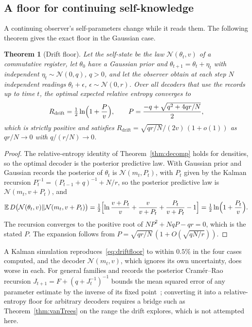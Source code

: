 \documentclass[12pt]{article}
\newtheorem{theorem}{Theorem}[section]
\theoremstyle{definition}
\theoremstyle{remark}
\newcommand{\E}{\mathbb E}
\begin{document}
\subsection{A floor for continuing self-knowledge}

A continuing observer's self-parameters change while it reads them. The following theorem gives the exact floor in the Gaussian case.

\begin{theorem}[Drift floor]\label{thm:drift}
Let the self-state be the law $\mathcal N(\theta_t,v)$ of a commutative register, let $\theta_0$ have a Gaussian prior and $\theta_{t+1}=\theta_t+\eta_t$ with independent $\eta_t\sim\mathcal N(0,q)$, $q>0$, and let the observer obtain at each step $N$ independent readings $\theta_t+\epsilon$, $\epsilon\sim\mathcal N(0,r)$. Over all decoders that use the records up to time $t$, the optimal expected relative entropy converges to
\begin{equation}\label{eq:driftfloor}
R_{\mathrm{drift}}=\tfrac12\ln\Bigl(1+\frac Pv\Bigr),\qquad P=\frac{-q+\sqrt{q^2+4qr/N}}{2},
\end{equation}
which is strictly positive and satisfies $R_{\mathrm{drift}}=\sqrt{qr/N}/(2v)\,(1+o(1))$ as $qr/N\to0$ with $q/(r/N)\to0$.
\end{theorem}

\begin{proof}
The relative-entropy identity of Theorem~\ref{thm:decomp} holds for densities, so the optimal decoder is the posterior predictive law. With Gaussian prior and Gaussian records the posterior of $\theta_t$ is $\mathcal N(m_t,P_t)$, with $P_t$ given by the Kalman recursion $P_{t}^{-1}=(P_{t-1}+q)^{-1}+N/r$, so the posterior predictive law is $\mathcal N(m_t,v+P_t)$, and
\[
\E\,D\bigl(\mathcal N(\theta_t,v)\Vert\mathcal N(m_t,v+P_t)\bigr)=\tfrac12\Bigl[\ln\frac{v+P_t}{v}+\frac{v}{v+P_t}+\frac{P_t}{v+P_t}-1\Bigr]=\tfrac12\ln\Bigl(1+\frac{P_t}v\Bigr).
\]
The recursion converges to the positive root of $NP^2+NqP-qr=0$, which is the stated $P$. The expansion follows from $P=\sqrt{qr/N}\,(1+O(\sqrt{qN/r}))$.
\end{proof}

A Kalman simulation reproduces~\eqref{eq:driftfloor} to within $0.5\%$ in the four cases computed, and the decoder $\mathcal N(m_t,v)$, which ignores its own uncertainty, does worse in each. For general families and records the posterior Cram\'er--Rao recursion $J_{t+1}=F+(q+J_t^{-1})^{-1}$ bounds the mean squared error of any parameter estimate by the inverse of its fixed point~\cite{Tichavsky1998}; converting it into a relative-entropy floor for arbitrary decoders requires a bridge such as Theorem~\ref{thm:vanTrees} on the range the drift explores, which is not attempted here.
\end{document}
